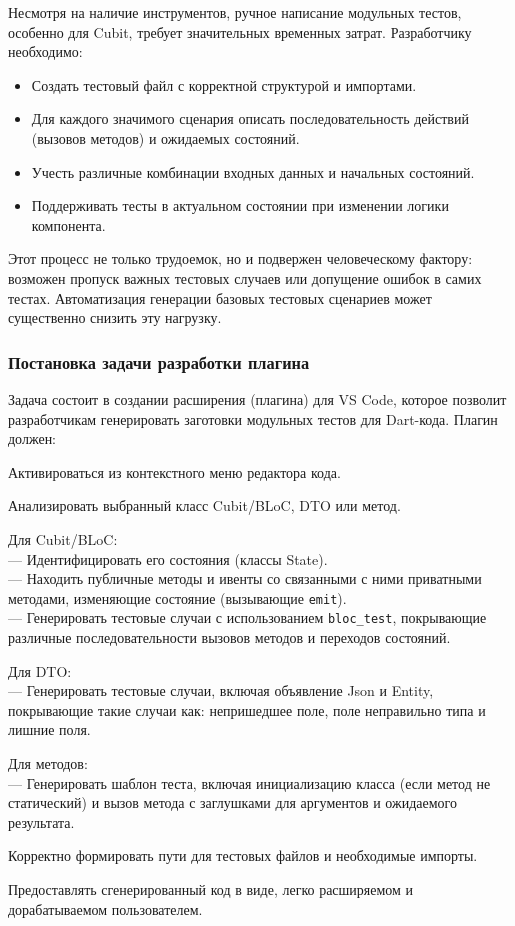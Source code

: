 \documentclass[14pt, russian]{scrartcl}
\begin{document}
Несмотря на наличие инструментов, ручное написание модульных тестов, особенно для Cubit, требует значительных временных затрат. Разработчику необходимо:
\begin{itemize}
    \item Создать тестовый файл с корректной структурой и импортами.
    \item Для каждого значимого сценария описать последовательность действий (вызовов методов) и ожидаемых состояний.
    \item Учесть различные комбинации входных данных и начальных состояний.
    \item Поддерживать тесты в актуальном состоянии при изменении логики компонента.
\end{itemize}
Этот процесс не только трудоемок, но и подвержен человеческому фактору: возможен пропуск важных тестовых случаев или допущение ошибок в самих тестах. Автоматизация генерации базовых тестовых сценариев может существенно снизить эту нагрузку.

\subsubsection{Постановка задачи разработки плагина}
Задача состоит в создании расширения (плагина) для VS Code, которое позволит разработчикам генерировать заготовки модульных тестов для Dart-кода. Плагин должен:
\begin{enumerate*}
    \item Активироваться из контекстного меню редактора кода.
    \item Анализировать выбранный класс Cubit/BLoC, DTO или метод.
    \item Для Cubit/BLoC:
            \\ --- Идентифицировать его состояния (классы State).
            \\ --- Находить публичные методы и ивенты со связанными с ними приватными методами, изменяющие состояние (вызывающие \texttt{emit}).
            \\ --- Генерировать тестовые случаи с использованием \texttt{bloc\_test}, покрывающие различные последовательности вызовов методов и переходов состояний.\\
    \item Для DTO:
            \\ --- Генерировать тестовые случаи, включая объявление Json и Entity, покрывающие такие случаи как: непришедшее поле, поле неправильно типа и лишние поля.\\
    \item Для методов:
            \\ --- Генерировать шаблон теста, включая инициализацию класса (если метод не статический) и вызов метода с заглушками для аргументов и ожидаемого результата.\\
    \item Корректно формировать пути для тестовых файлов и необходимые импорты.
    \item Предоставлять сгенерированный код в виде, легко расширяемом и дорабатываемом пользователем.
\end{enumerate*}
\end{document}

